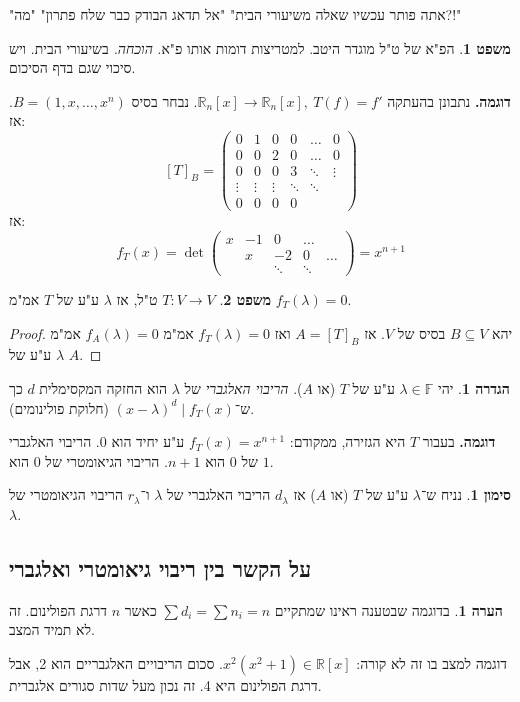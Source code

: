\documentclass[a4paper]{article}
\newcommand\R     {\mathbb{R}}
\newcommand\F         {\mathbb{F}}
\newcommand\co        {\colon}
\newcommand\pms[1]    {\begin{pmatrix}
		#1
\end{pmatrix}}
\renewcommand\lg      {\lambda}
\theoremstyle{definition}
\newtheorem{Theorem}{משפט}
\newtheorem{definition}{הגדרה}
\newtheorem{Remark}{הערה}
\newtheorem{Notion}{סימון}
\newcommand\theo  [1] {\begin{Theorem}#1\end{Theorem}}
\newcommand\defi  [1] {\begin{definition}#1\end{definition}}
\newcommand\rmark [1] {\begin{Remark}#1\end{Remark}}
\newcommand\noti  [1] {\begin{Notion}#1\end{Notion}}
\begin{document}
	"אתה פותר עכשיו שאלה משיעורי הבית" "אל תדאג הבודק כבר שלח פתרון" "מה?!"
	
	\theo{הפ"א של ט"ל מוגדר היטב. למטריצות דומות אותו פ"א. \textit{הוכחה. }בשיעורי הבית. ויש סיכוי שגם בדף הסיכום. }
	
	\textbf{דוגמה. }נתבונן בהעתקה $\R_n[x] \to \R_n[x], \ T(f) = f'$. נבחר בסיס $B = (1, x, \dots, x^{n})$. אז: 
	\[ [T]_B = \pms{0 & 1  & 0 & 0 & \dots & 0 \\ 0 & 0 & 2 & 0 & \dots & 0 \\ 0 & 0 & 0 & 3 & \ddots & \vdots \\ \vdots & \vdots & \vdots & \ddots & \ddots \\ 0 & 0 & 0 & 0 } \]
	אז: 
	\[ f_T(x) = \det\pms{x & -1 & 0 &\dots \\ & x & -2 & 0 &\dots \\ && \ddots &\ddots } = x^{n + 1} \]
	\theo{$T \co V \to V$ ט"ל, אז $\lg$ ע"ע של $T$ אמ"מ $f_T(\lg) = 0$. }
	\begin{proof}
		יהא $B \subseteq V$ בסיס של $V$. אז $A = [T]_B$ ואז $f_T(\lg) = 0$ אמ"מ $f_A(\lg) = 0$ אמ"מ $\lg$ ע"ע של $A$. 
	\end{proof}
	
	\defi{יהי $\lg \in \F$ ע"ע של $T$ (או $A$). \textit{הריבוי האלגברי} של $\lg$ הוא החזקה המקסימלית $d$ כך ש־$(x - \lg)^{d} \mid f_T(x)$ (חלוקת פולינומים). }
	
	\textbf{דוגמה. }בעבור $T$ היא הגזירה, ממקודם: $f_T(x) = x^{n + 1}$ ע"ע יחיד הוא $0$. הריבוי האלגברי של $0$ הוא $n + 1$. הריבוי הגיאומטרי של $0$ הוא $1$. 
	
	\noti{נניח ש־$\lg$ ע"ע של $T$ (או $A$) אז $d_\lg$ הריבוי האלגברי של $\lg$ ו־$r_\lg$ הריבוי הגיאומטרי של $\lg$. }
	\subsection{על הקשר בין ריבוי גיאומטרי ואלגברי}
	
%		
	\rmark{בדוגמה שבטענה ראינו שמתקיים $\sum d_i = \sum n_i = n$ כאשר $n$ דרגת הפולינום. זה לא תמיד המצב. 
	
	דוגמה למצב בו זה לא קורה: $x^2(x^2 + 1) \in \R[x]$. סכום הריבויים האלגבריים הוא 2, אבל דרגת הפולינום היא 4. זה נכון מעל שדות סגורים אלגברית. }
	
\end{document}
